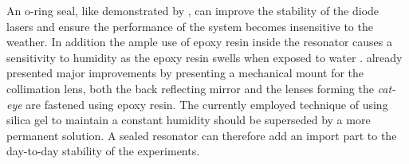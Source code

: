 An o-ring seal, like demonstrated by \cite{ecdl_silicone_housing}, can improve the stability of the diode lasers and ensure the performance of the system becomes insensitive to the weather. In addition the ample use of epoxy resin inside the resonator causes a sensitivity to humidity as the epoxy resin swells when exposed to water \cite{epoxy_humidity}. \citeauthor{thesis_tilman} \cite{thesis_tilman} already presented major improvements by presenting a mechanical mount for the collimation lens, both the back reflecting mirror and the lenses forming the \textit{cat-eye} \cite{ecdl_paris} are fastened using epoxy resin. The currently employed technique of using silica gel to maintain a constant humidity should be superseded by a more permanent solution. A sealed resonator can therefore add an import part to the day-to-day stability of the experiments.
